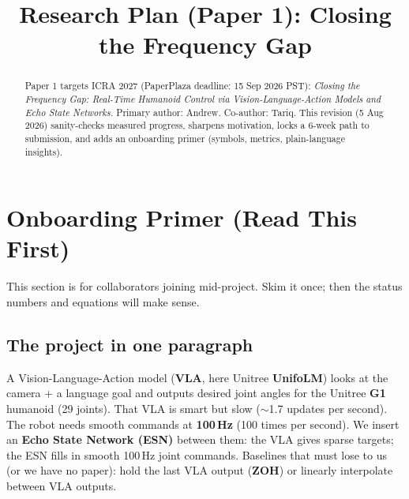 \documentclass[conference]{IEEEtran}
\begin{document}
\title{Research Plan (Paper 1): Closing the Frequency Gap}

\author{
\and
{}
}

\maketitle

\begin{abstract}
Paper 1 targets ICRA 2027 (PaperPlaza deadline: 15 Sep 2026 PST):
\emph{Closing the Frequency Gap: Real-Time Humanoid Control via Vision-Language-Action Models and Echo State Networks.}
Primary author: Andrew. Co-author: Tariq.
This revision (5 Aug 2026) sanity-checks measured progress, sharpens motivation, locks a 6-week path to submission, and adds an onboarding primer (symbols, metrics, plain-language insights).
\end{abstract}

\section{Onboarding Primer (Read This First)}
\noindent
This section is for collaborators joining mid-project. Skim it once; then the status numbers and equations will make sense.

\subsection{The project in one paragraph}
A Vision-Language-Action model (\textbf{VLA}, here Unitree \textbf{UnifoLM}) looks at the camera + a language goal and outputs desired joint angles for the Unitree \textbf{G1} humanoid (29 joints).
That VLA is smart but slow ($\sim$1.7 updates per second).
The robot needs smooth commands at \textbf{100\,Hz} (100 times per second).
We insert an \textbf{Echo State Network (ESN)} between them: the VLA gives sparse targets; the ESN fills in smooth 100\,Hz joint commands.
Baselines that must lose to us (or we have no paper): hold the last VLA output (\textbf{ZOH}) or linearly interpolate between VLA outputs.
\end{document}
